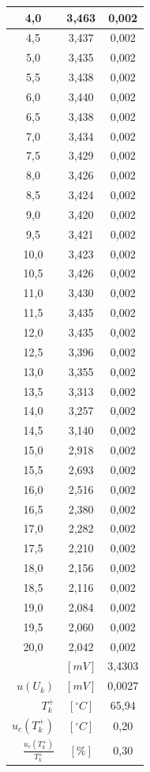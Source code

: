 \documentclass[polish, 11pt, a4paper]{article}
\begin{document}
\begin{table}[H]
\begin{minipage}{.5\textwidth}
\begin{tabular}{|c|c|c|}
					4,0	&	3,463	&	0,002	\\\hline
					4,5	&	3,437	&	0,002	\\\hline
					5,0	&	3,435	&	0,002	\\\hline
					5,5	&	3,438	&	0,002	\\\hline
					6,0	&	3,440	&	0,002	\\\hline
					6,5	&	3,438	&	0,002	\\\hline
					7,0	&	3,434	&	0,002	\\\hline
					7,5	&	3,429	&	0,002	\\\hline
					8,0	&	3,426	&	0,002	\\\hline
					8,5	&	3,424	&	0,002	\\\hline
					9,0	&	3,420	&	0,002	\\\hline
					9,5	&	3,421	&	0,002	\\\hline
					10,0	&	3,423	&	0,002	\\\hline
					10,5	&	3,426	&	0,002	\\\hline
					11,0	&	3,430	&	0,002	\\\hline
					11,5	&	3,435	&	0,002	\\\hline
					12,0	&	3,435	&	0,002	\\\hline
					12,5	&	3,396	&	0,002	\\\hline
					13,0	&	3,355	&	0,002	\\\hline
					13,5	&	3,313	&	0,002	\\\hline
					14,0	&	3,257	&	0,002	\\\hline
					14,5	&	3,140	&	0,002	\\\hline
					15,0	&	2,918	&	0,002	\\\hline
					15,5	&	2,693	&	0,002	\\\hline
					16,0	&	2,516	&	0,002	\\\hline
					16,5	&	2,380	&	0,002	\\\hline
					17,0	&	2,282	&	0,002	\\\hline
					17,5	&	2,210	&	0,002	\\\hline
					18,0	&	2,156	&	0,002	\\\hline
					18,5	&	2,116	&	0,002	\\\hline
					19,0	&	2,084	&	0,002	\\\hline
					19,5	&	2,060	&	0,002	\\\hline
					20,0	&	2,042	&	0,002	\\\Xhline{3\arrayrulewidth}
					\multicolumn{1}{|r}{\(U_k\)}	&	\([mV]\)	&	3,4303	\\\hline
					\multicolumn{1}{|r}{\(u(U_k)\)}	&	\([mV]\)	&	0,0027	\\\hline
					\multicolumn{1}{|r}{\(T_k^+\)}	&	\([^\circ C]\)	&	65,94	\\\hline
					\multicolumn{1}{|r}{\(u_c(T_k^+)\)}	&	\([^\circ C]\)	&	0,20	\\\hline
					\multicolumn{1}{|r}{\(\frac{u_c(T_k^+)}{T_k^+}\)}	&	\([\%]\)	&	0,30	\\\hline
				\end{tabular}
			\end{minipage}
		\end{table}
	
\end{document}
